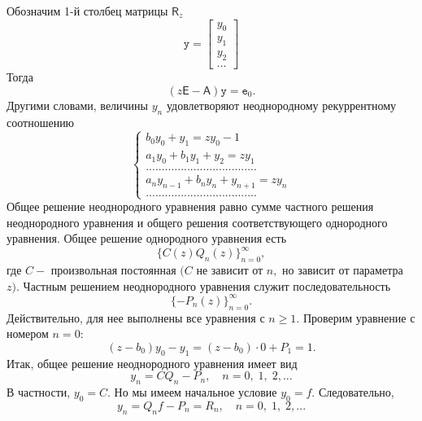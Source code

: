 \documentclass[12 pt, a4 paper]{article}
\theoremstyle{plain}   \newtheorem{Pro}{Задача}
\begin{document}
Обозначим 1-й столбец матрицы
$ \mathsf{R}_z $
\begin{equation*}
  \mathtt{y}=
    \begin{bmatrix}
	  y_0 \\
	  y_1 \\
	  y_2 \\
	  \dots
	\end{bmatrix}
\end{equation*}
Тогда
$$
  (z \mathsf{E} - \mathsf{A} ) \mathtt{y}= \mathtt{e}_0 .
$$
Другими словами, величины
$ y_n $
удовлетворяют неоднородному рекуррентному соотношению
\begin{equation*}
  \begin{cases}
    b_0 y_0 + y_1 =z y_0 -1 \\
	a_1 y_0 + b_1 y_1 + y_2 =z y_1 \\
	...................................\\
	a_n y_{n-1}+b_n y_n +y_{n+1}=zy_n \\
	...................................
  \end{cases}
\end{equation*}
Общее решение неоднородного уравнения равно сумме
частного решения неоднородного уравнения и
общего решения соответствующего однородного уравнения.
Общее решение однородного уравнения есть
$$
  \{ C(z) Q_n (z) \} _{n=0}^{\infty},
$$
где
$ C - $
произвольная постоянная
$ ( C $
не зависит от
$ n ,$
но зависит от параметра
$ z ). $
Частным решением неоднородного уравнения служит последовательность
$$
 \{ - P_n (z) \} _{n=0}^{\infty}.
$$
Действительно, для нее выполнены все уравнения с
$ n \geq 1. $
Проверим уравнение с номером
$ n=0: $
$$
  (z-b_0 )y_0 -y_1 =(z-b_0 ) \cdot 0 + P_1 =1.
$$
Итак, общее решение неоднородного уравнения имеет вид
$$
  y_n =CQ_n -P_n , \quad n=0, \; 1, \; 2,...
$$
В частности,
$ y_0 =C. $
Но мы имеем начальное условие
$ y_0 =f . $
Следовательно,
$$
  y_n =Q_n f - P_n = R_n ,
  \quad n=0, \; 1, \; 2,...
$$
\\
\end{document}
